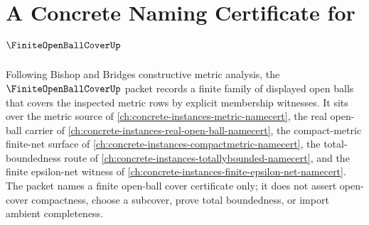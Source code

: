 \chapter{A Concrete Naming Certificate for $\FiniteOpenBallCoverUp$}
\label{ch:concrete-instances-finite-open-ball-cover-namecert}

Following Bishop and Bridges constructive metric analysis, the $\FiniteOpenBallCoverUp$ packet records a finite family of displayed open balls that covers the inspected metric rows by explicit membership witnesses. It sits over the metric source of \autoref{ch:concrete-instances-metric-namecert}, the real open-ball carrier of \autoref{ch:concrete-instances-real-open-ball-namecert}, the compact-metric finite-net surface of \autoref{ch:concrete-instances-compactmetric-namecert}, the total-boundedness route of \autoref{ch:concrete-instances-totallybounded-namecert}, and the finite epsilon-net witness of \autoref{ch:concrete-instances-finite-epsilon-net-namecert}. The packet names a finite open-ball cover certificate only; it does not assert open-cover compactness, choose a subcover, prove total boundedness, or import ambient completeness.

